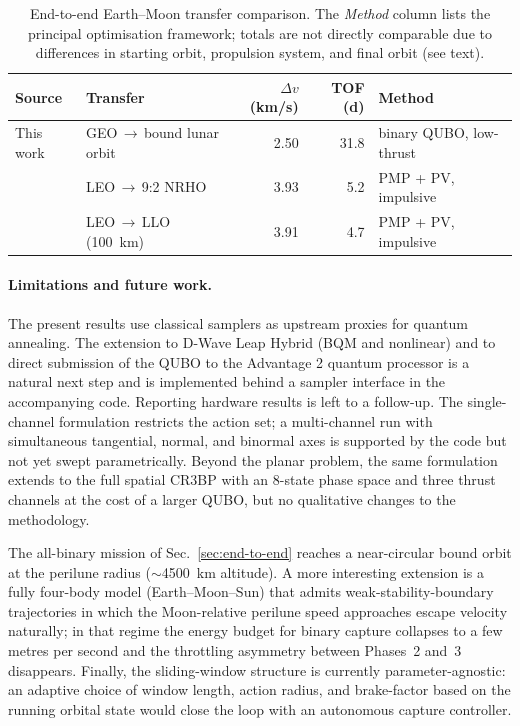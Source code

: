 \documentclass[11pt,a4paper]{article}
\theoremstyle{plain}
\begin{document}
\begin{table}[htbp]
\centering
\caption{End-to-end Earth--Moon transfer comparison. The
\emph{Method} column lists the principal optimisation framework;
totals are not directly comparable due to differences in starting
orbit, propulsion system, and final orbit (see text).}
\label{tab:purdue-comparison}
\begin{tabular}{llrrl}
\toprule
Source & Transfer & $\Delta v$ (km/s) & TOF (d) & Method \\
\midrule
This work
  & GEO\,$\to$\,bound lunar orbit
  & \num{2.50} & \num{31.8}
  & binary QUBO, low-thrust \\
\cite{Taylor2026}
  & LEO\,$\to$\,9{:}2 NRHO
  & \num{3.93} & \num{5.2}
  & PMP + PV, impulsive \\
\cite{Taylor2026}
  & LEO\,$\to$\,LLO (\SI{100}{\km})
  & \num{3.91} & \num{4.7}
  & PMP + PV, impulsive \\
\bottomrule
\end{tabular}
\end{table}

\paragraph{Limitations and future work.} The present results use
classical samplers as upstream proxies for quantum
annealing. The extension to D-Wave Leap Hybrid (BQM and
nonlinear) and to direct submission of the QUBO to the
Advantage 2 quantum processor is a natural next step and is
implemented behind a sampler interface in the accompanying code.
Reporting hardware results is left to a follow-up.
The single-channel formulation restricts the action set; a
multi-channel run with simultaneous tangential, normal, and
binormal axes is supported by the code but not yet swept
parametrically. Beyond the planar problem, the same
formulation extends to the full spatial CR3BP with an 8-state
phase space and three thrust channels at the cost of a larger
QUBO, but no qualitative changes to the methodology.

The all-binary mission of Sec.~\ref{sec:end-to-end} reaches a
near-circular bound orbit at the perilune radius
($\sim$\SI{4500}{\km} altitude). A more interesting
extension is a fully four-body model (Earth--Moon--Sun) that
admits weak-stability-boundary trajectories in which the
Moon-relative perilune speed approaches escape velocity
naturally; in that regime the energy budget for binary capture
collapses to a few metres per second and the throttling
asymmetry between Phases~2 and~3 disappears. Finally, the
sliding-window structure is currently parameter-agnostic: an
adaptive choice of window length, action radius, and
brake-factor based on the running orbital state would close
the loop with an autonomous capture controller.
\end{document}
